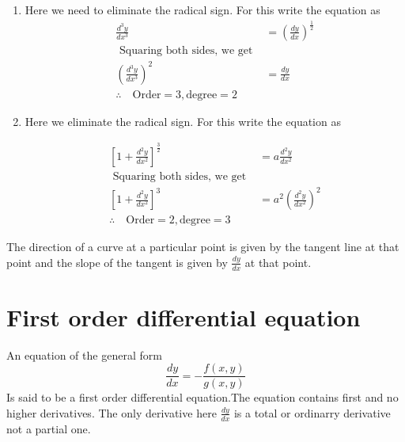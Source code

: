 \begin{answer}\hspace{0.5cm}
\begin{enumerate}
	\item Here we need to eliminate the radical sign.
	For this write the equation as
	\\\begin{align*}
	\frac{d^{3} y}{d x^{3}}&=\left(\frac{d y}{d x}\right)^{\frac{1}{2}}\\\text{ Squaring both sides, we get  }\\\left(\frac{d^{3} y}{d x^{3}}\right)^{2}&=\frac{d y}{d x}\\
	\therefore \quad  \text{Order} =3,\text{degree} =2
	\end{align*}
	\item Here we eliminate the radical sign. For this write the equation as
	
   \begin{align*}
	\left[1+\frac{d^{2} y}{d x^{2}}\right]^{\frac{3}{2}}&=a \frac{d^{2} y}{d x^{2}}
	\\\text{ Squaring both sides, we get  }\\\left[1+\frac{d^{2} y}{d x^{2}}\right]^{3}&=a^{2}\left(\frac{d^{2} y}{d x^{2}}\right)^{2}\\
	\therefore \quad  \text{Order} =2,\text{degree} =3
	\end{align*}
\end{enumerate}
\end{answer}
\begin{note}
The direction of a curve at a particular point is given by the tangent line at that point and the slope of the tangent is given by $\frac{dy}{dx}$ at that point.	
\end{note}
\section{First order differential equation}
An equation of the general form
$$
\frac{d y}{d x}=-\frac{f(x, y)}{g(x, y)}
$$
Is said to be a first order differential equation.The equation contains first and no higher derivatives. The only derivative here $\frac{d y}{d x}$ is a total or ordinarry derivative not a partial one.
